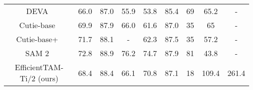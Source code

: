 \begin{table*}[t]
{\begin{tabular}{c|cccc|c|c|c|c}
DEVA~\citep{cheng2023tracking}                                                      & 66.0                                                & 87.0                                                     & 55.9                                               & 53.8                                                & 85.4                                                     &      69                                                                     & 65.2  & -            \\
Cutie-base~\citep{cheng2024putting}                                                & 69.9                                                & 87.9                                                     & 66.0                                               & 61.6                                                & 87.0                                                     & 35                                                                        & 65    & -            \\
Cutie-base+~\citep{cheng2024putting}                                               & 71.7                                                & 88.1                                                     & -                                                  & 62.3                                                & 87.5                                                     & 35                                                                        & 57.2  & -            \\
SAM 2~\citep{ravi2024sam}                                                     & 72.8                                                & 88.9                                                     &             76.2                                       &         74.7                                        & 87.9                                                     & 81                                                                        & 43.8  & -            \\ \hline
\rowcolor{gray} EfficientTAM-Ti/2 (ours) & 68.4                                                & 88.4                                                     & 66.1                                               & 70.8                                                & 87.1                                                     & 18                                                                        & 109.4 & 261.4        \\

\end{tabular}}
\end{table*}

